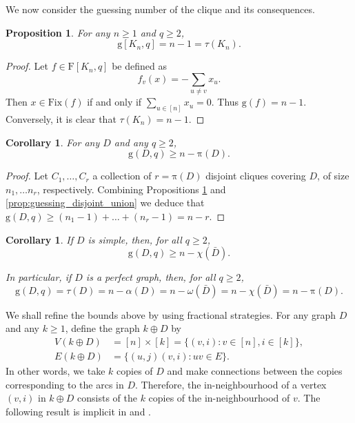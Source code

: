 \documentclass[a4paper, 11pt]{book}
\numberwithin{equation}{section}
\theoremstyle{plain}
\newtheorem{corollary}	[equation]	{Corollary}
\newtheorem{proposition}[equation]	{Proposition}
\newcommand{\feedback}{\tau}
\newcommand{\acyclic}{\alpha}
\newcommand{\independence}{\acyclic}
\newcommand{\chromatic}{\chi}
\newcommand{\clique}{\omega}
\newcommand{\cliqueCover}{\mathrm{\pi}}
\newcommand{\functions}{\mathrm{F}}
\newcommand{\Fix}{\mathrm{Fix}}
\newcommand{\guessing}{\mathrm{g}}
\renewcommand{\(}{\ldbrack}
\renewcommand{\)}{\rdbrack}
\begin{document}
We now consider the guessing number of the clique and its consequences.

\begin{proposition} \label{prop:g_clique}
For any $n \ge 1$ and $q \ge 2$, 
\[
	\guessing[K_n, q] = n-1 = \feedback(K_n).
\]
\end{proposition}


\begin{proof}
Let $f \in \functions[K_n, q]$ be defined as
\[
	f_v(x) = - \sum_{u \ne v} x_u.
\]
Then $x \in \Fix(f)$ if and only if $\sum_{u \in [n]} x_u = 0$. Thus $\guessing(f) = n-1$. Conversely, it is clear that $\feedback(K_n) = n-1$.
\end{proof}


\begin{corollary} \label{cor:g_clique_partition}
For any $D$ and any $q \ge 2$, 
\[
	\guessing(D,q) \ge n - \cliqueCover(D).
\]
\end{corollary}

\begin{proof}
Let $C_1,\dots,C_r$ a collection of $r = \cliqueCover(D)$ disjoint cliques covering $D$, of size $n_1,\dots n_r$, respectively. Combining Propositions \ref{prop:g_clique} and \ref{prop:guessing_disjoint_union} we deduce that $\guessing(D,q) \ge (n_1-1) + \dots + (n_r-1) = n-r$. 
\end{proof}



\begin{corollary} \label{cor:perfect_graphs}
If $D$ is simple, then, for all $q\ge 2$, 
\[
	\guessing(D,q) \ge n - \chromatic(\bar{D}).
\]

In particular, if $D$ is a perfect graph, then, for all $q\ge 2$, 
\[
	\guessing(D,q) = \feedback(D) = n -\independence(D)=n- \clique(\bar{D})=n-\chromatic(\bar{D})=n-\cliqueCover(D).
\]
\end{corollary}




We shall refine the bounds above by using fractional strategies. For any graph $D$ and any $k \ge 1$, define the graph $k \oplus D$ by
\begin{align*}
	V(k \oplus D) &= [n] \times [k]  = \{(v,i): v \in [n], i \in [k]\},\\
	E(k \oplus D) &= \{(u,j)(v,i) : uv \in E\}.
\end{align*}
In other words, we take $k$ copies of $D$ and make connections between the copies corresponding to the arcs in $D$. Therefore, the in-neighbourhood of a vertex $(v,i)$ in $k \oplus D$ consists of the $k$ copies of the in-neighbourhood of $v$. The following result is implicit in \cite{Rii07} and \cite{GR11}.
\end{document}
